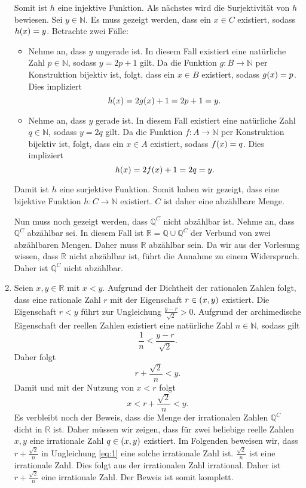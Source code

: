 \documentclass[german,12pt]{homework}
\newcommand{\NN}{\mathbb{N}}
\newcommand{\QQ}{\mathbb{Q}}
\newcommand{\RR}{\mathbb{R}}
\DeclarePairedDelimiter{\enbrace}{(}{)}
\begin{document}
\begin{enumerate}
\begin{itemize}
        \end{itemize}
        Somit ist \(h\) eine injektive Funktion. Als nächstes wird die Surjektivität von \(h\) bewiesen. Sei \(y \in \NN\). Es muss gezeigt werden, dass ein \(x \in C\) existiert, sodass \(h\enbrace*{x} = y\). Betrachte zwei Fälle:
        \begin{itemize}
            \item Nehme an, dass \(y\) ungerade ist. In diesem Fall existiert eine natürliche Zahl \(p \in \NN\), sodass \(y = 2p + 1\) gilt. Da die Funktion \(g: B \to \NN\) per Konstruktion bijektiv ist, folgt, dass ein \(x \in B\) existiert, sodass \(g\enbrace*{x} = p\). Dies impliziert
            \[h\enbrace*{x} = 2g\enbrace*{x} + 1 = 2p + 1 = y.\]
            \item Nehme an, dass \(y\) gerade ist. In diesem Fall existiert eine natürliche Zahl \(q \in \NN\), sodass \(y = 2q\) gilt. Da die Funktion \(f: A \to \NN\) per Konstruktion bijektiv ist, folgt, dass ein \(x \in A\) existiert, sodass \(f\enbrace*{x} = q\). Dies impliziert
            \[h\enbrace*{x} = 2f\enbrace*{x} + 1 = 2q = y.\]
        \end{itemize}
        Damit ist \(h\) eine surjektive Funktion. Somit haben wir gezeigt, dass eine bijektive Funktion \(h: C \to \NN\) existiert. \(C\) ist daher eine abzählbare Menge.

        Nun muss noch gezeigt werden, dass \(\QQ^C\) nicht abzählbar ist. Nehme an, dass \(\QQ^C\) abzählbar sei. In diesem Fall ist \(\RR = \QQ \cup \QQ^C\) der Verbund von zwei abzählbaren Mengen. Daher muss \(\RR\) abzählbar sein. Da wir aus der Vorlesung wissen, dass \(\RR\) nicht abzählbar ist, führt die Annahme zu einem Widerspruch. Daher ist \(\QQ^C\) nicht abzählbar.
        \item Seien \(x, y \in \RR\) mit \(x < y\). Aufgrund der Dichtheit der rationalen Zahlen folgt, dass eine rationale Zahl \(r\) mit der Eigenschaft \(r \in \enbrace*{x, y}\) existiert. Die Eigenschaft \(r < y\) führt zur Ungleichung \(\frac{y - r}{\sqrt{2}} > 0\). Aufgrund der archimedische Eigenschaft der reellen Zahlen existiert eine natürliche Zahl \(n \in \NN\), sodass gilt
        \[\frac{1}{n} < \frac{y - r}{\sqrt{2}}.\]
        Daher folgt
        \[r + \frac{\sqrt{2}}{n} < y.\]
        Damit und mit der Nutzung von \(x < r\) folgt
        \begin{equation}\label{eq:1}
            x < r + \frac{\sqrt{2}}{n} < y.
        \end{equation}
        Es verbleibt noch der Beweis, dass die Menge der irrationalen Zahlen \(\QQ^C\) dicht in \(\RR\) ist. Daher müssen wir zeigen, dass für zwei beliebige reelle Zahlen \(x, y\) eine irrationale Zahl \(q \in \enbrace*{x, y}\) existiert. Im Folgenden beweisen wir, dass \(r + \frac{\sqrt{2}}{n}\) in Ungleichung \eqref{eq:1} eine solche irrationale Zahl ist. \(\frac{\sqrt{2}}{n}\) ist eine irrationale Zahl. Dies folgt aus der irrationalen Zahl irrational. Daher ist \(r + \frac{\sqrt{2}}{n}\) eine irrationale Zahl. Der Beweis ist somit komplett.
    \end{enumerate}
\end{document}
